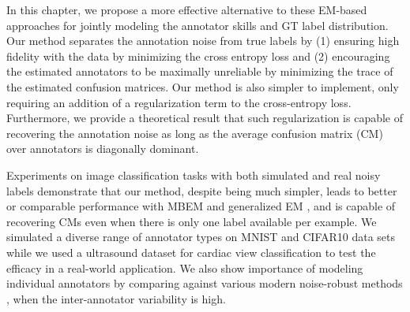 In this chapter, we propose a more effective alternative to these EM-based approaches for jointly modeling the annotator skills and GT label distribution. Our method separates the annotation noise from true labels by
(1) ensuring high fidelity with the data by minimizing the cross entropy loss and (2) encouraging the estimated annotators to be maximally unreliable by minimizing the trace of the estimated confusion matrices. Our method is also simpler to implement, only requiring an addition of a regularization term to the cross-entropy loss. Furthermore, we provide a theoretical result that such regularization is capable of recovering the annotation noise as long as the average confusion matrix (CM) over annotators is diagonally dominant. 

Experiments on image classification tasks with both simulated and real noisy labels demonstrate that our method, despite being much simpler, leads to better or comparable performance with MBEM \cite{khetan2017learning} and generalized EM \cite{raykar2009supervised,raykar2010learning}, and is capable of recovering CMs even when there is only one label available per example. We simulated a diverse range of annotator types on MNIST and CIFAR10 data sets while we used a ultrasound dataset for cardiac view classification to test the efficacy in a real-world application. We also show importance of modeling individual annotators by comparing against various modern noise-robust methods \cite{reed2014training,sukhbaatar2014training,goldberger2016training,guan2017said}, when the inter-annotator variability is high. 

    
